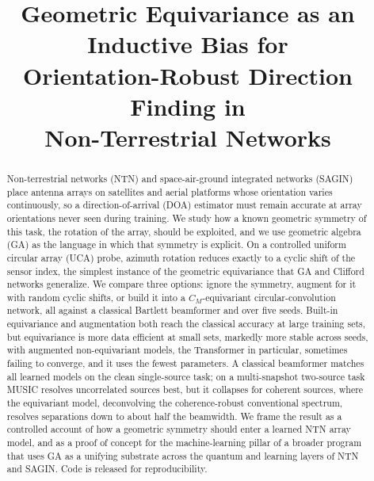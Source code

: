 \documentclass[conference]{IEEEtran}
\begin{document}
\title{Geometric Equivariance as an Inductive Bias for\\
Orientation-Robust Direction Finding in\\
Non-Terrestrial Networks}

\author{
}

\maketitle

\begin{abstract}
Non-terrestrial networks (NTN) and space-air-ground integrated networks (SAGIN)
place antenna arrays on satellites and aerial platforms whose orientation varies
continuously, so a direction-of-arrival (DOA) estimator must remain accurate at
array orientations never seen during training. We study how a known geometric
symmetry of this task, the rotation of the array, should be exploited, and we use
geometric algebra (GA) as the language in which that symmetry is explicit. On a
controlled uniform circular array (UCA) probe, azimuth rotation reduces exactly to
a cyclic shift of the sensor index, the simplest instance of the geometric
equivariance that GA and Clifford networks generalize. We compare three options:
ignore the symmetry, augment for it with random cyclic shifts, or build it into a
$C_M$-equivariant circular-convolution network, all against a classical Bartlett
beamformer and over five seeds. Built-in equivariance and augmentation both reach
the classical accuracy at large training sets, but equivariance is more data
efficient at small sets, markedly more stable across seeds, with augmented
non-equivariant models, the Transformer in particular, sometimes failing to
converge, and it uses the fewest parameters. A classical beamformer matches all
learned models on the clean single-source task; on a multi-snapshot two-source task
MUSIC resolves uncorrelated sources best, but it collapses for coherent sources,
where the equivariant model, deconvolving the coherence-robust conventional spectrum,
resolves separations down to about half the beamwidth. We frame the result as a
controlled account of how a geometric symmetry should enter a learned NTN array
model, and as a proof of concept for the machine-learning pillar of a broader program
that uses GA as a unifying substrate across the quantum and learning layers of NTN
and SAGIN. Code is released for reproducibility.
\end{abstract}
\end{document}

